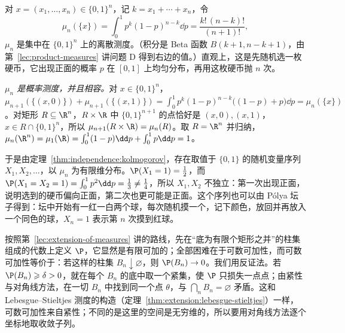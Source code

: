 \begin{example}[一个不独立的序列]\label{ex:independence:kolmogorov-polya}
对 $x=(x_1,\dots,x_n)\in\{0,1\}^n$，记 $k=x_1+\cdots+x_n$，令
\[
\mu_n(\{x\})=\int_0^1p^k(1-p)^{n-k}\dd p=\frac{k!\,(n-k)!}{(n+1)!},
\]
$\mu_n$ 是集中在 $\{0,1\}^n$ 上的离散测度。（积分是 Beta 函数 $B(k+1,n-k+1)$，由第~\ref{lec:product-measures} 讲问题 D 得到右边的值。）直观上，这是先随机选一枚硬币，它出现正面的概率 $p$ 在 $[0,1]$ 上均匀分布，再用这枚硬币抛 $n$ 次。

\emph{$\mu_n$ 是概率测度，并且相容。}对 $x\in\{0,1\}^n$，$\mu_{n+1}(\{(x,0)\})+\mu_{n+1}(\{(x,1)\})=\int_0^1p^k(1-p)^{n-k}\bigl((1-p)+p\bigr)\dd p=\mu_n(\{x\})$。对矩形 $R\subseteq\R^n$，$R\times\R$ 中 $\{0,1\}^{n+1}$ 的点恰好是 $(x,0),(x,1)$，$x\in R\cap\{0,1\}^n$，所以 $\mu_{n+1}(R\times\R)=\mu_n(R)$。取 $R=\R^n$ 并归纳，$\mu_n(\R^n)=\mu_1(\R)=\int_0^1(1-p)\dd p+\int_0^1p\dd p=1$。

于是由定理~\ref{thm:independence:kolmogorov}，存在取值于 $\{0,1\}$ 的随机变量序列 $X_1,X_2,\dots$，以 $\mu_n$ 为有限维分布。$\P(X_1=1)=\frac12$，而 $\P(X_1=X_2=1)=\int_0^1p^2\dd p=\frac13\neq\frac14$，所以 $X_1,X_2$ 不独立：第一次出现正面，说明选到的硬币偏向正面，第二次也更可能是正面。这个序列也可以由 Pólya 坛子得到：坛中开始有一红一白两个球，每次随机摸一个，记下颜色，放回并再放入一个同色的球，$X_n=1$ 表示第 $n$ 次摸到红球。
\end{example}

\begin{remark}[证明思路]
按照第~\ref{lec:extension-of-measures} 讲的路线，先在“底为有限个矩形之并”的柱集组成的代数上定义 $\P$，它显然是有限可加的；全部困难在于可数可加性，而可数可加性等价于：若这样的柱集 $B_n\downarrow\varnothing$，则 $\P(B_n)\to0$。我们用反证法。若 $\P(B_n)\geqslant\delta>0$，就在每个 $B_n$ 的底中取一个紧集，使 $\P$ 只损失一点点；由紧性与对角线方法，在一切 $B_n$ 中找到同一个点 $\theta$，与 $\bigcap_nB_n=\varnothing$ 矛盾。这和 Lebesgue--Stieltjes 测度的构造（定理~\ref{thm:extension:lebesgue-stieltjes}）一样，可数可加性来自紧性；不同的是这里的空间是无穷维的，所以要用对角线方法逐个坐标地取收敛子列。
\end{remark}

